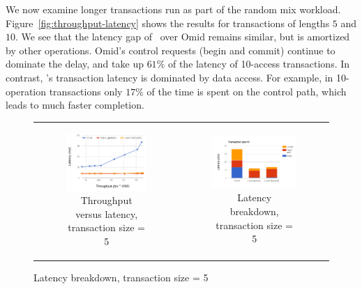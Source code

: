 We now examine longer transactions run as part of the random mix workload.
Figure~\ref{fig:throughput-latency} shows the results for transactions of lengths $5$ and $10$.
We see that the latency gap of \sys\ over Omid remains similar, but is amortized 
by other operations. Omid's control requests (begin and commit) continue to 
dominate the delay, and take up $61\%$ of the latency of 10-access transactions.
In contrast, \sys's transaction latency is dominated by data access. For example, in 10-operation transactions only 
$17\%$ of the time is spent on the control path, which leads to much faster completion. 

\begin{figure}[t]
\begin{tabular}{cc}
  \begin{subfigure}[t]{0.5\textwidth}
	\includegraphics[width=\textwidth]{figs/thpt-latency-5.png}
	\caption[]{Throughput versus latency, transaction size = 5}
    \label{fig:tl-5}
  \end{subfigure} &

   \begin{subfigure}[t]{0.5\textwidth}
	\includegraphics[width=.9\textwidth]{figs/stack-tx5.png}
	\caption[]{Latency breakdown, transaction size = 5}
    \label{fig:stack-tx5}
  \end{subfigure} \\
  

\end{tabular}
\end{figure}
